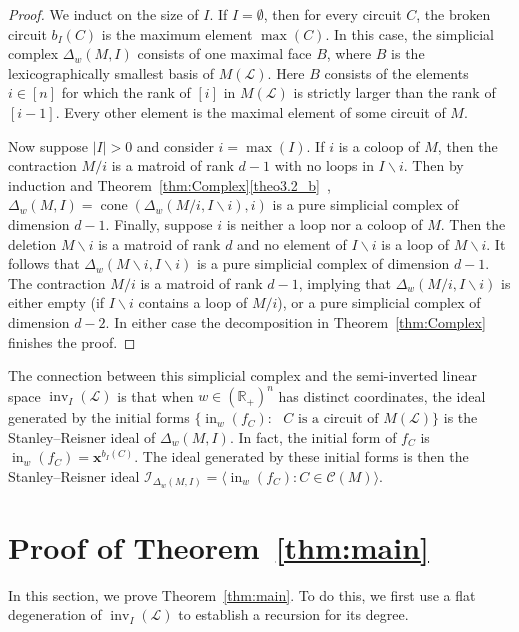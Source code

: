 \documentclass[10pt]{amsart}
\theoremstyle{definition}
\newcommand{\R}{\mathbb{R}}
\newcommand{\I}{\mathcal{I}}
\newcommand{\cL}{\mathcal{L}}
\newcommand{\CC}{\mathcal{C}}
\newcommand{\x}{\mathbf{x}}
\DeclareMathOperator{\In}{in}
\DeclareMathOperator{\inv}{inv}
\DeclareMathOperator{\cone}{cone}
\begin{document}
\begin{proof}
We induct on the size of $I$. If $I = \emptyset$, then for every circuit $C$, the broken circuit $b_I(C)$ is 
the maximum element $\max(C)$. In this case, the simplicial complex $\Delta_w(M,I)$ consists of 
one maximal face $B$, where $B$ is the lexicographically smallest basis of $M(\cL)$. 
Here $B$ consists of the elements $i\in [n]$ for which the rank of $[i]$ in $M(\cL)$ is strictly larger than the rank of $[i-1]$. 
Every other element is the maximal element of some circuit of $M$. 

Now suppose $|I| >0$ and consider $i = \max(I)$. If $i$ is a coloop of $M$, then the contraction $M/i$ is a matroid of rank $d-1$ with no loops in $I\backslash i$. 
Then by induction and Theorem~\ref{thm:Complex}\ref{theo3.2_b}~, $\Delta_w(M,I) = \cone (\Delta_w(M/i,I\backslash i),i)$ is a pure simplicial complex of 
dimension $d-1$. Finally, suppose $i$ is neither a loop nor a coloop of $M$. 
Then the deletion $M\backslash i$ is a matroid of rank $d$ and 
no element of $I\backslash i$ is a loop of $M\backslash i$. It follows that $\Delta_w(M\backslash i, I\backslash i)$ is a pure simplicial complex of 
dimension $d-1$. The contraction $M/i$ is a matroid of rank $d-1$, implying that $\Delta_w(M/i,I\backslash i)$ is either empty (if $I\backslash i$ contains a loop of $M/i$), 
or a pure simplicial complex of dimension $d-2$. In either case the decomposition in Theorem~\ref{thm:Complex} finishes the proof.
\end{proof}
The connection between this simplicial complex and the semi-inverted linear space $\inv_I(\cL)$ 
is that when $w \in (\R_+)^n$ has distinct coordinates, the ideal generated by the initial forms $\{ \In_w(f_C) : \text{ $C$ is a circuit of }M(\cL)\}$ 
is the Stanley--Reisner ideal of $\Delta_w(M,I)$. In fact, the initial form of $f_C$ is $\In_w(f_C) =\x^{b_I(C)}$.
The ideal generated by these initial forms is then the Stanley--Reisner ideal $\I_{\Delta_w(M,I) } = \langle \In_w(f_C):C \in \CC (M) \rangle$.


\section{Proof of Theorem~\ref{thm:main}}\label{sec:proof}

In this section, we prove Theorem~\ref{thm:main}. To do this, we first use a flat degeneration of $\inv_I(\cL)$ 
to establish a recursion for its degree. 
\end{document}
